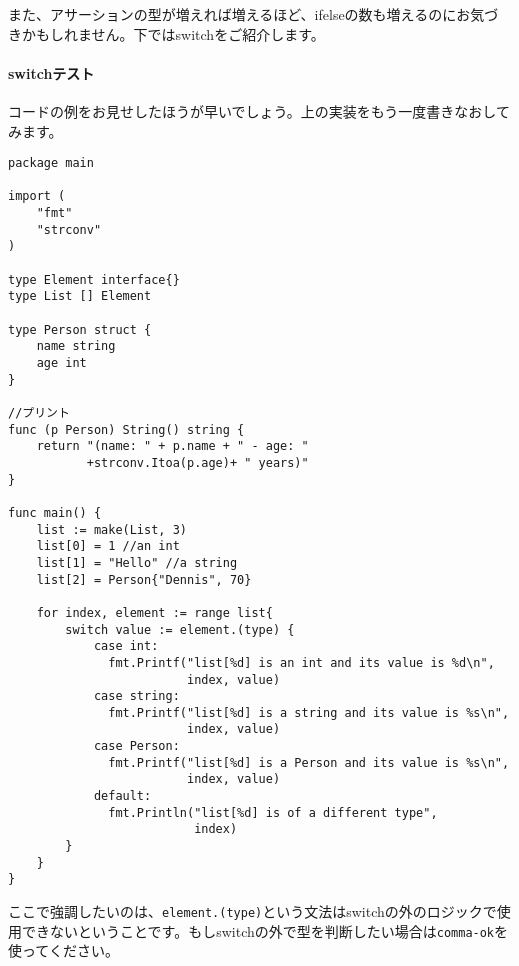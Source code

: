 また、アサーションの型が増えれば増えるほど、ifelseの数も増えるのにお気づきかもしれません。下ではswitchをご紹介します。

\paragraph{switchテスト}

コードの例をお見せしたほうが早いでしょう。上の実装をもう一度書きなおしてみます。

\begin{lstlisting}[numbers=none]
package main

import (
    "fmt"
    "strconv"
)

type Element interface{}
type List [] Element

type Person struct {
    name string
    age int
}

//プリント
func (p Person) String() string {
    return "(name: " + p.name + " - age: "
           +strconv.Itoa(p.age)+ " years)"
}

func main() {
    list := make(List, 3)
    list[0] = 1 //an int
    list[1] = "Hello" //a string
    list[2] = Person{"Dennis", 70}

    for index, element := range list{
        switch value := element.(type) {
            case int:
              fmt.Printf("list[%d] is an int and its value is %d\n",
                         index, value)
            case string:
              fmt.Printf("list[%d] is a string and its value is %s\n",
                         index, value)
            case Person:
              fmt.Printf("list[%d] is a Person and its value is %s\n",
                         index, value)
            default:
              fmt.Println("list[%d] is of a different type",
                          index)
        }
    }
}
\end{lstlisting}

ここで強調したいのは、\texttt{element.(type)}という文法はswitchの外のロジックで使用できないということです。もしswitchの外で型を判断したい場合は\texttt{comma-ok}を使ってください。
